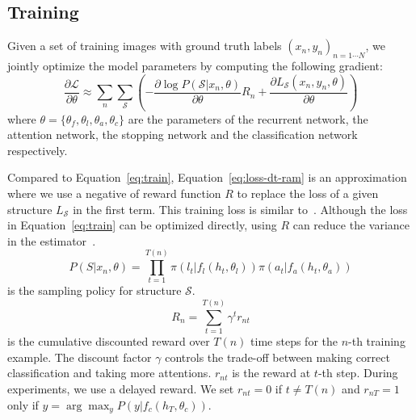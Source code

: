 \documentclass[10pt,twocolumn,letterpaper]{article}
\newcommand{\pian}[2]{\frac{\partial #1}{\partial #2}}
\begin{document}
\subsection{Training}

Given a set of training images with ground truth labels $(x_n, y_n)_{n=1\cdots N}$, we jointly optimize the model parameters by computing the following gradient:
\begin{equation}
\pian{\mathcal{L}}{\theta} \approx \sum_n \sum_{\mathcal{S}} \left( - \pian{\log P(\mathcal{S}|x_n, \theta)}{\theta}R_n + \pian{L_\mathcal{S}(x_n, y_n, \theta)}{\theta} \right)
\label{eq:loss-dt-ram}
\end{equation}
where $\theta = \{\theta_f, \theta_l, \theta_a, \theta_c\}$ are the parameters of the recurrent network, the attention network, the stopping network and the classification network respectively.

Compared to Equation~\ref{eq:train}, Equation~\ref{eq:loss-dt-ram} is an approximation where we use a negative of reward function $R$ to replace the loss of a given structure $L_\mathcal{S}$ in the first term.
This training loss is similar to~\cite{mnih2014recurrent, ba2014multiple}.
Although the loss in Equation~\ref{eq:train} can be optimized directly, using $R$ can reduce the variance in the estimator~\cite{ba2014multiple}.
\begin{equation}
P(S|x_n, \theta) = \prod_{t=1}^{T(n)} \pi(l_t | f_l(h_t, \theta_l)) \pi(a_t | f_a(h_t, \theta_a))
\end{equation}
is the sampling policy for structure $\mathcal{S}$.
\begin{equation}
  R_n = \sum_{t=1}^{T(n)} \gamma^t r_{nt}
\end{equation}
is the cumulative discounted reward over $T(n)$ time steps for the $n$-th training example.
The discount factor $\gamma$ controls the trade-off between making correct classification and taking more attentions.
$r_{nt}$ is the reward at $t$-th step.
During experiments, we use a delayed reward.
We set $r_{nt}=0$ if $t \neq T(n)$ and $r_{nT}=1$ only if $y = \arg\max_y P(y|f_c(h_T, \theta_c))$.
\end{document}
